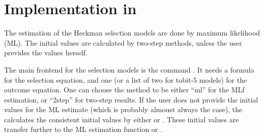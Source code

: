 \section[Implementation]{Implementation in }

The estimation of the Heckman selection models are done by maximum
likelihood (ML).  The initial values are calculated by two-step methods,
unless the user prevides the values herself.  

The main frontend for the selection models is the command
.  It needs a formula for the selection equation, and
one (or a list of two for tobit-5 models) for the outcome equation.
One can choose the method to be either ``ml'' for the MLf estimation,
or ``2step'' for two-step results.  If the user does not provide the
initial values for the ML estimate (which is probably almoust always
the case), the  calculates the consistent initial
values by either  or .  These initial
values are transfer further to the ML estimation function
 or .
